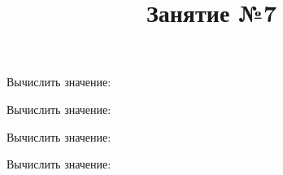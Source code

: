 \begin{listofex}
	\item Вычислить значение:
	\begin{enumcols}[itemcolumns=3]
		\item {}
		\item {}
		\item {}
		\item {}
		\item {}
		\item {}
	\end{enumcols}
\item Вычислить значение:
\begin{enumcols}[itemcolumns=1]
	\item {}
	\item {}
	\item {}
\end{enumcols}
	\item Вычислить значение:
	\begin{enumcols}[itemcolumns=2]
		\item {}
		\item {}
		\item {}
		\item {}
		\item {}
	\end{enumcols}
	\item Вычислить значение:
	\begin{enumcols}[itemcolumns=2]
		\item {}
		\item {}
		\item {}
	\end{enumcols}
	\item {}
	\item {}
	\item {}
\end{listofex}
\newpage
\title{Занятие №7}
